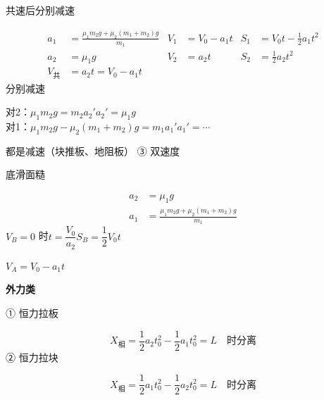 \noindent 共速后分别减速

\begin{align*}
a_1&=\frac{\mu_1m_2g+\mu_2(m_1+m_2)g}{m_1} & V_1&=V_0-a_1t & S_1&=V_0t-\frac12a_1t^2\\
a_2&=\mu_1g & V_2&=a_2t & S_2&=\frac12a_2t^2\\
V_{\text{共}}&=a_2t=V_0-a_1t
\end{align*}
\noindent 分别减速

\noindent 对2：$\mu_1m_2g=m_2a_2'$\quad $a_2'=\mu_1g$\\
对1：$\mu_1m_2g-\mu_2(m_1+m_2)g=m_1a_1'$\quad $a_1'=\cdots$%

\noindent 都是减速（块推板、地阻板）%
\noindent ③ 双速度

\noindent 底滑面糙

\begin{align*}
a_2&=\mu_1g\\
a_1&=\frac{\mu_1m_2g+\mu_2(m_1+m_2)g}{m_1}
\end{align*}
\noindent $V_B=0$ 时\quad $t=\dfrac{V_0}{a_2}$\quad $S_B=\dfrac12V_0t$

\noindent $V_A=V_0-a_1t$

\textbf{外力类}

\noindent ① 恒力拉板

\[
X_{\text{相}}=\frac12a_2t_0^2-\frac12a_1t_0^2=L\quad\text{时分离}
\]
\noindent ② 恒力拉块

\[
X_{\text{相}}=\frac12a_1t_0^2-\frac12a_2t_0^2=L\quad\text{时分离}
\]
